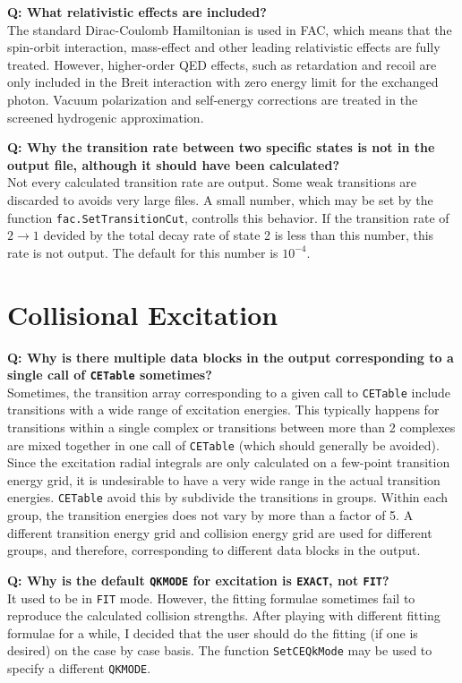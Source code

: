 \documentclass[twoside,letterpaper]{refrep}
\newcommand{\key}[1]{\texttt{#1}}
\newcounter{faq}[section]
\newcommand{\faq}[2]{\stepcounter{faq}
	\begin{minipage}{\textwidth}
	\textbf{Q\arabic{faq}: #1?}\\#2
	\end{minipage}}
\begin{document}
\faq{What relativistic effects are included}{
The standard Dirac-Coulomb Hamiltonian is used in FAC, which means that the
spin-orbit interaction, mass-effect and other leading relativistic effects are
fully treated. However, higher-order QED effects, such as retardation and
recoil are only included in the Breit interaction with zero energy limit for
the exchanged photon. Vacuum polarization and self-energy corrections are
treated in the screened hydrogenic approximation.}

\faq{Why the transition rate between two specific states is not in the output
file, although it should have been calculated}{
Not every calculated transition rate are output. Some weak transitions are
discarded to avoids very large files. A small number, which may be set by the
function \key{fac.SetTransitionCut}, controlls this behavior. If the
transition rate of $2\to 1$ devided by the total decay rate of state 2 is less
than this number, this rate is not output. The default for this number is
$10^{-4}$.}

\section{Collisional Excitation}
\faq{Why is there multiple data blocks in the output corresponding to a single
call of \key{CETable} sometimes}{
Sometimes, the transition array corresponding to a given call to \key{CETable}
include transitions with a wide range of excitation energies. This typically
happens for transitions within a single complex or transitions between more
than 2 complexes are mixed together in one call of \key{CETable} (which should
generally be avoided). Since the excitation radial integrals are only
calculated on a few-point transition energy grid, it is undesirable to have a
very wide range in the actual transition energies. \key{CETable} avoid this by
subdivide the transitions in groups. Within each group, the transition
energies does not vary by more than a factor of 5. A different transition
energy grid and collision energy grid are used for different groups, and
therefore, corresponding to different data blocks in the output.}

\faq{Why is the default \key{QKMODE} for excitation is \key{EXACT}, not
\key{FIT}}{
It used to be in \key{FIT} mode. However, the fitting formulae sometimes fail
to reproduce the calculated collision strengths. After playing with different
fitting formulae for a while, I decided that the user should do the fitting
(if one is desired) on the case by case basis. The function \key{SetCEQkMode}
may be used to specify a different \key{QKMODE}.}
\end{document}
